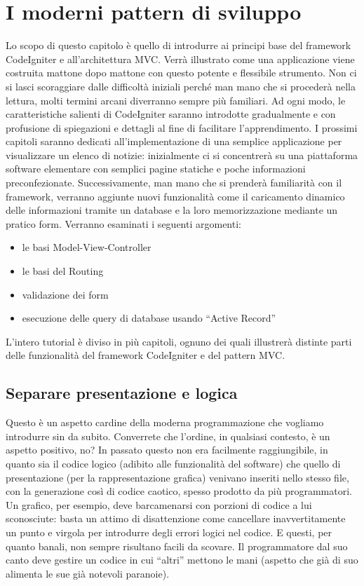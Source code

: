 \chapter{I moderni pattern di sviluppo}
\label{cap:pattern}

Lo scopo di questo capitolo è quello di introdurre ai principi base del framework CodeIgniter e all'architettura \ac{MVC}. Verrà illustrato come una applicazione viene costruita mattone dopo mattone con questo potente e flessibile strumento. Non ci si lasci scoraggiare dalle difficoltà iniziali perché man mano che si procederà nella lettura, molti termini arcani diverranno sempre più familiari. Ad ogni modo, le caratteristiche salienti di CodeIgniter saranno introdotte gradualmente e con profusione di spiegazioni e dettagli al fine di facilitare l'apprendimento. I prossimi capitoli saranno dedicati all'implementazione di una semplice applicazione per visualizzare un elenco di notizie: inizialmente ci si concentrerà su una piattaforma software elementare con semplici pagine statiche e poche informazioni preconfezionate. Successivamente, man mano che si prenderà familiarità con il framework, verranno aggiunte nuovi funzionalità come il caricamento dinamico delle informazioni tramite un database e la loro memorizzazione mediante un pratico form. Verranno esaminati i seguenti argomenti:

\begin{itemize}
\item le basi Model-View-Controller
\item le basi del Routing
\item validazione dei form
\item esecuzione delle query di database usando “Active Record”
\end{itemize}

L'intero tutorial è diviso in più capitoli, ognuno dei quali illustrerà distinte parti delle funzionalità del framework CodeIgniter e del pattern \ac{MVC}.

\section{Separare presentazione e logica}
Questo è un aspetto cardine della moderna programmazione che vogliamo introdurre sin da subito. Converrete che l'ordine, in qualsiasi contesto, è un aspetto positivo, no? In passato questo non era facilmente raggiungibile, in quanto sia il codice logico (adibito alle funzionalità del software) che quello di presentazione (per la rappresentazione grafica) venivano inseriti nello stesso file, con la generazione così di codice caotico, spesso prodotto da più programmatori. Un grafico, per esempio, deve barcamenarsi con porzioni di codice a lui sconosciute: basta un attimo di disattenzione come cancellare inavvertitamente un punto e virgola per introdurre degli errori logici nel codice. E questi, per quanto banali, non sempre risultano facili da scovare. Il programmatore dal suo canto deve gestire un codice in cui ``altri'' mettono le mani (aspetto che già di suo alimenta le sue già notevoli paranoie). 

